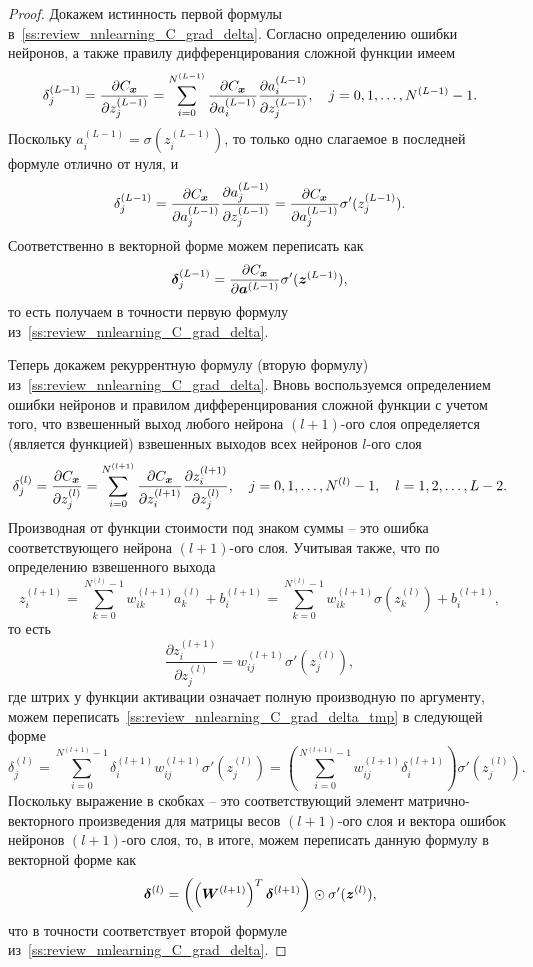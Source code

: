 \documentclass[a4paper,12pt,russian]{article} %
\begin{document}
\begin{proof}
	Докажем истинность первой формулы в~\eqref{ss:review_nnlearning_C_grad_delta}.
	Согласно определению ошибки нейронов, а также правилу дифференцирования сложной функции имеем
	$$
		\delta_j^{(L-1)} = \frac{\partial C_{\bm{x}}}{\partial z_j^{(L-1)}} =
			\sum_{i=0}^{N^{(L-1)}} 
				\frac{\partial C_{\bm{x}}}{\partial a_i^{(L-1)}}
				\frac{\partial a_i^{(L-1)}}{\partial z_j^{(L-1)}},
		\quad
		j = 0, 1, \ldots, N^{(L-1)}-1.
	$$
	Поскольку $a_i^{(L-1)} = \sigma(z_i^{(L-1)})$, то только одно слагаемое в последней формуле отлично от нуля, и
	$$
		\delta_j^{(L-1)} =
			\frac{\partial C_{\bm{x}}}{\partial a_j^{(L-1)}}
			\frac{\partial a_j^{(L-1)}}{\partial z_j^{(L-1)}} =
			\frac{\partial C_{\bm{x}}}{\partial a_j^{(L-1)}}
			\sigma'(z_j^{(L-1)}).
	$$
	Соответственно в векторной форме можем переписать как
	$$
		\bm{\delta}_j^{(L-1)} =
			\frac{\partial C_{\bm{x}}}{\partial \bm{a}^{(L-1)}}
			\sigma'(\bm{z}^{(L-1)}),
	$$
	то есть получаем в точности первую формулу из~\eqref{ss:review_nnlearning_C_grad_delta}.
	
	Теперь докажем рекуррентную формулу (вторую формулу) из~\eqref{ss:review_nnlearning_C_grad_delta}.
	Вновь воспользуемся определением ошибки нейронов и правилом дифференцирования сложной функции с учетом того, что взвешенный выход любого нейрона $(l+1)$-ого слоя определяется (является функцией) взвешенных выходов всех нейронов $l$-ого слоя
	\begin{equation} \label{ss:review_nnlearning_C_grad_delta_tmp}
		\delta_j^{(l)} = \frac{\partial C_{\bm{x}}}{\partial z_j^{(l)}} =
			\sum_{i=0}^{N^{(l+1)}} 
				\frac{\partial C_{\bm{x}}}{\partial z_i^{(l+1)}}
				\frac{\partial z_i^{(l+1)}}{\partial z_j^{(l)}},
		\quad
		j = 0, 1, \ldots, N^{(l)}-1,
		\quad
		l = 1, 2, \ldots, L-2.
	\end{equation}
	Производная от функции стоимости под знаком суммы -- это ошибка соответствующего нейрона $(l+1)$-ого слоя.
	Учитывая также, что по определению взвешенного выхода
	$$
		z_i^{(l+1)} = 
			\sum_{k=0}^{N^{(l)}-1}
				w_{ik}^{(l+1)} a_k^{(l)} + b_i^{(l+1)} =
			\sum_{k=0}^{N^{(l)}-1}
				w_{ik}^{(l+1)} \sigma(z_k^{(l)}) + b_i^{(l+1)},
	$$
	то есть
	$$
		\frac{\partial z_i^{(l+1)}}{\partial z_j^{(l)}} = 
				w_{ij}^{(l+1)} \sigma'(z_j^{(l)}),
	$$
	где штрих у функции активации означает полную производную по аргументу, можем переписать~\eqref{ss:review_nnlearning_C_grad_delta_tmp} в следующей форме
	$$
		\delta_j^{(l)} =
			\sum_{i=0}^{N^{(l+1)}-1} 
				\delta_i^{(l+1)} w_{ij}^{(l+1)} \sigma'(z_j^{(l)}) =
			\left( \sum_{i=0}^{N^{(l+1)}-1}  w_{ij}^{(l+1)} \delta_i^{(l+1)} \right) \sigma'(z_j^{(l)}).
	$$
	Поскольку выражение в скобках -- это соответствующий элемент матрично-векторного произведения для матрицы весов $(l+1)$-ого слоя и вектора ошибок нейронов $(l+1)$-ого слоя, то, в итоге, можем переписать данную формулу в векторной форме как
	$$
		\bm{\delta}^{(l)} = \left( \left( \bm{W}^{(l+1)} \right)^T \bm{\delta}^{(l+1)} \right) \odot \sigma'(\bm{z}^{(l)}),
	$$
	что в точности соответствует второй формуле из~\eqref{ss:review_nnlearning_C_grad_delta}.
	

\end{proof}
\end{document}
